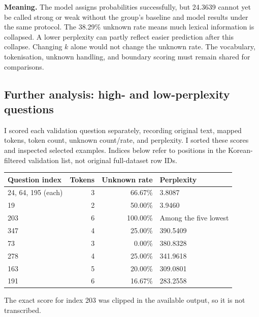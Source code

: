 \documentclass[11pt,a4paper]{article}
\begin{document}
\textbf{Meaning.} The model assigns probabilities successfully, but 24.3639 cannot yet be called strong or weak without the group's baseline and model results under the same protocol. The 38.29\% unknown rate means much lexical information is collapsed. A lower perplexity can partly reflect easier prediction after this collapse. Changing $k$ alone would not change the unknown rate. The vocabulary, tokenisation, unknown handling, and boundary scoring must remain shared for comparisons.

\subsection{Further analysis: high- and low-perplexity questions}
I scored each validation question separately, recording original text, mapped tokens, token count, unknown count/rate, and perplexity. I sorted these scores and inspected selected examples. Indices below refer to positions in the Korean-filtered validation list, not original full-dataset row IDs.

\begin{center}
\small
\begin{tabular}{lrrl}
\toprule
Question index & Tokens & Unknown rate & Perplexity \\
\midrule
24, 64, 195 (each) & 3 & 66.67\% & 3.8087 \\
19 & 2 & 50.00\% & 3.9460 \\
203 & 6 & 100.00\% & Among the five lowest \\
\midrule
347 & 4 & 25.00\% & 390.5409 \\
73 & 3 & 0.00\% & 380.8328 \\
278 & 4 & 25.00\% & 341.9618 \\
163 & 5 & 20.00\% & 309.0801 \\
191 & 6 & 16.67\% & 283.2558 \\
\bottomrule
\end{tabular}
\end{center}
The exact score for index 203 was clipped in the available output, so it is not transcribed.
\end{document}
